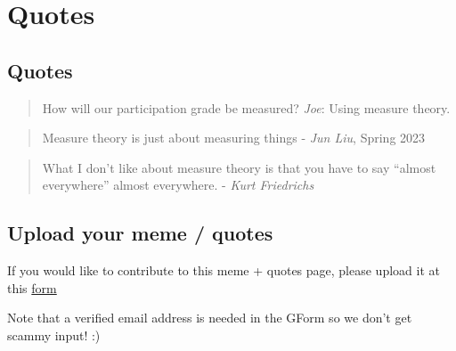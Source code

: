 \documentclass[
  letterpaper,
  DIV=11,
  numbers=noendperiod]{scrreprt}
\theoremstyle{plain}
\theoremstyle{definition}
\theoremstyle{remark}
\begin{document}
\hypertarget{quotes}{%
\chapter*{Quotes}\label{quotes}}


\hypertarget{quotes-1}{%
\section*{Quotes}\label{quotes-1}}


\begin{quote}
How will our participation grade be measured? \emph{Joe}: Using measure
theory.
\end{quote}

\begin{quote}
Measure theory is just about measuring things - \emph{Jun Liu}, Spring
2023
\end{quote}

\begin{quote}
What I don't like about measure theory is that you have to say ``almost
everywhere'' almost everywhere. - \emph{Kurt Friedrichs}
\end{quote}

\hypertarget{upload-your-meme-quotes}{%
\section*{Upload your meme / quotes}\label{upload-your-meme-quotes}}


If you would like to contribute to this meme + quotes page, please
upload it at this \href{https://forms.gle/RBmMNYJp4u3qD5W79}{form}

Note that a verified email address is needed in the GForm so we don't
get scammy input! :)

\(\,\)
\end{document}
